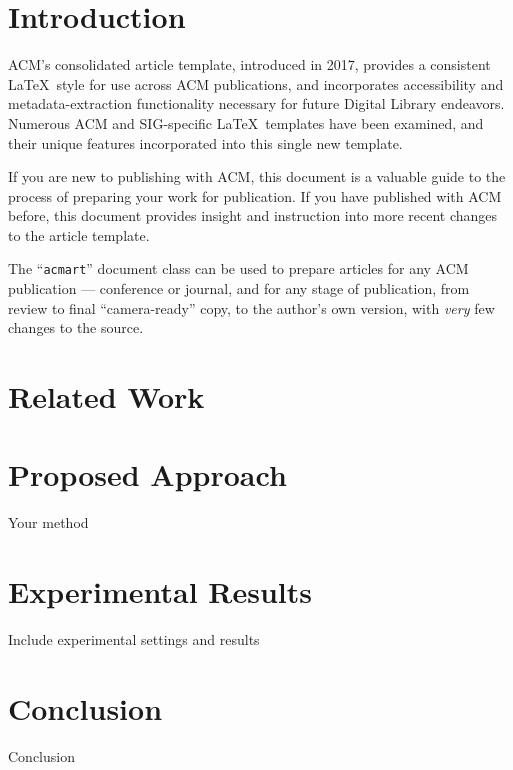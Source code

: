 \documentclass[sigconf,authordraft]{acmart}
\begin{document}


\maketitle

\section{Introduction}
ACM's consolidated article template, introduced in 2017, provides a
consistent \LaTeX\ style for use across ACM publications, and
incorporates accessibility and metadata-extraction functionality
necessary for future Digital Library endeavors. Numerous ACM and
SIG-specific \LaTeX\ templates have been examined, and their unique
features incorporated into this single new template.

If you are new to publishing with ACM, this document is a valuable
guide to the process of preparing your work for publication. If you
have published with ACM before, this document provides insight and
instruction into more recent changes to the article template.

The ``\verb|acmart|'' document class can be used to prepare articles
for any ACM publication --- conference or journal, and for any stage
of publication, from review to final ``camera-ready'' copy, to the
author's own version, with {\itshape very} few changes to the source.

\section{Related Work}

\section{Proposed Approach}
Your method

\section{Experimental Results}
Include experimental settings and results

\section{Conclusion}
Conclusion




\end{document}
